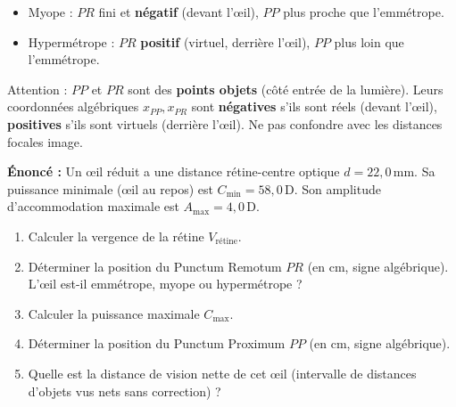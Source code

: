 \documentclass[11pt]{article}
\newcommand{\cle}[1]{{\popxbold\color{popdark}#1}}
\begin{document}
\begin{methode}
\begin{enumerate}
\begin{itemize}
        \item Myope : $PR$ fini et \textbf{négatif} (devant l'œil), $PP$ plus proche que l'emmétrope.
        \item Hypermétrope : $PR$ \textbf{positif} (virtuel, derrière l'œil), $PP$ plus loin que l'emmétrope.
    \end{itemize}
\end{enumerate}
\cle{Attention :} $PP$ et $PR$ sont des \textbf{points objets} (côté entrée de la lumière). Leurs coordonnées algébriques $x_{PP}, x_{PR}$ sont \textbf{négatives} s'ils sont réels (devant l'œil), \textbf{positives} s'ils sont virtuels (derrière l'œil). Ne pas confondre avec les distances focales image.
\end{methode}

\begin{exoresolu}
\textbf{Énoncé :} Un œil réduit a une distance rétine-centre optique $d = 22,0\,\text{mm}$. Sa puissance minimale (œil au repos) est $C_{\text{min}} = 58,0\,\text{D}$. Son amplitude d'accommodation maximale est $A_{\text{max}} = 4,0\,\text{D}$.
\begin{enumerate}
    \item Calculer la vergence de la rétine $V_{\text{rétine}}$.
    \item Déterminer la position du Punctum Remotum $PR$ (en cm, signe algébrique). L'œil est-il emmétrope, myope ou hypermétrope ?
    \item Calculer la puissance maximale $C_{\text{max}}$.
    \item Déterminer la position du Punctum Proximum $PP$ (en cm, signe algébrique).
    \item Quelle est la distance de vision nette de cet œil (intervalle de distances d'objets vus nets sans correction) ?
\end{enumerate}


\end{exoresolu}
\end{document}

